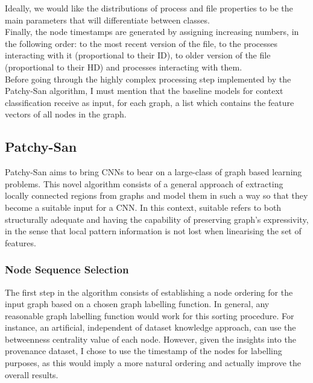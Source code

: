Ideally, we would like the distributions of process and file properties to be the main parameters that will differentiate between classes. \\

Finally, the node timestamps are generated by assigning increasing numbers, in the following order: to the most recent version of the file, to the processes interacting with it (proportional to their ID), to older version of the file (proportional to their HD) and processes interacting with them. \\

Before going through the highly complex processing step implemented by the Patchy-San algorithm, I must mention that the baseline models for context classification receive as input, for each graph, a list which contains the feature vectors of all nodes in the graph. \\

\subsection{Patchy-San} \label{PCSN}

Patchy-San aims to bring CNNs to bear on a large-class of graph based learning problems. This novel algorithm consists of a general approach of extracting locally connected regions from graphs and model them in such a way so that they become a suitable input for a CNN. In this context, suitable refers to both structurally adequate and having the capability of preserving graph's expressivity, in the sense that local pattern information is not lost when linearising the set of features. \\


\subsubsection*{Node Sequence Selection} \label{node_seq_sel}

The first step in the algorithm consists of establishing a node ordering for the input graph based on a chosen graph labelling function. In general, any reasonable graph labelling function would work for this sorting procedure. For instance, an artificial, independent of dataset knowledge approach, can use the betweenness centrality value of each node. However, given the insights into the provenance dataset, I chose to use the timestamp of the nodes for labelling purposes, as this would imply a more natural ordering and actually improve the overall results. \\


